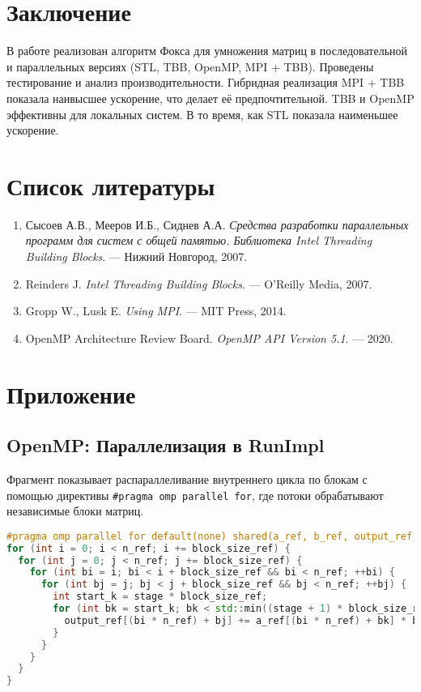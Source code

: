 \documentclass[12pt]{article}
\begin{document}
\section{Заключение}

\hspace*{1.25em}В работе реализован алгоритм Фокса для умножения матриц в последовательной и параллельных версиях (STL, TBB, OpenMP, MPI + TBB). Проведены тестирование и анализ производительности. Гибридная реализация MPI + TBB показала наивысшее ускорение, что делает её предпочтительной. TBB и OpenMP эффективны для локальных систем. В то время, как STL показала наименьшее ускорение.

\section{Список литературы}
\begin{enumerate}
 \item Сысоев А.В., Мееров И.Б., Сиднев А.А. \textit{Средства разработки параллельных программ для систем с общей памятью. Библиотека Intel Threading Building Blocks}. — Нижний Новгород, 2007.
    \item Reinders J. \textit{Intel Threading Building Blocks}. — O’Reilly Media, 2007.
    \item Gropp W., Lusk E. \textit{Using MPI}. — MIT Press, 2014.
    \item OpenMP Architecture Review Board. \textit{OpenMP API Version 5.1}. — 2020.

\end{enumerate}

\appendix
\section*{Приложение}

\subsection*{OpenMP: Параллелизация в RunImpl}

Фрагмент показывает распараллеливание внутреннего цикла по блокам с помощью директивы \texttt{\#pragma omp parallel for}, где потоки обрабатывают независимые блоки матриц.

\begin{lstlisting}[language=C++]
#pragma omp parallel for default(none) shared(a_ref, b_ref, output_ref, n_ref, block_size_ref, stage)
for (int i = 0; i < n_ref; i += block_size_ref) {
  for (int j = 0; j < n_ref; j += block_size_ref) {
    for (int bi = i; bi < i + block_size_ref && bi < n_ref; ++bi) {
      for (int bj = j; bj < j + block_size_ref && bj < n_ref; ++bj) {
        int start_k = stage * block_size_ref;
        for (int bk = start_k; bk < std::min((stage + 1) * block_size_ref, n_ref); ++bk) {
          output_ref[(bi * n_ref) + bj] += a_ref[(bi * n_ref) + bk] * b_ref[(bk * n_ref) + bj];
        }
      }
    }
  }
}
\end{lstlisting}
\end{document}
